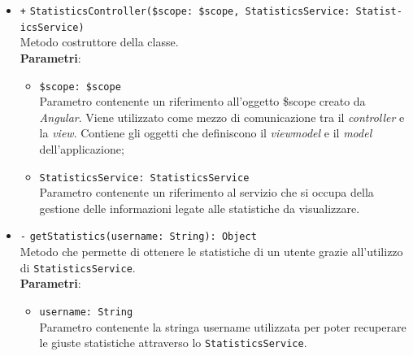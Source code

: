 \begin{itemize}
		\begin{itemize}
		\item \texttt{+} \texttt{StatisticsController(\$scope: \$scope, StatisticsService: Statist-\\icsService)} \\ 
		Metodo costruttore della classe. \\
		\textbf{Parametri}:
		\begin{itemize}
			\item \texttt{\$scope: \$scope} \\
			Parametro contenente un riferimento all'oggetto \$scope creato da \textit{Angular}. Viene utilizzato come mezzo di comunicazione tra il \textit{controller} e la \textit{view}. Contiene gli oggetti che definiscono il \textit{viewmodel} e il \textit{model} dell'applicazione;
			\item \texttt{StatisticsService: StatisticsService} \\
			Parametro contenente un riferimento al servizio che si occupa della gestione delle informazioni legate alle statistiche da visualizzare.
		\end{itemize}
		\item \texttt{-} \texttt{getStatistics(username: String): Object} \\ 
		Metodo che permette di ottenere le statistiche di un utente grazie all'utilizzo di \texttt{StatisticsService}. \\
		\textbf{Parametri}: 
		\begin{itemize}
			\item \texttt{username: String} \\
			Parametro contenente la stringa username utilizzata per poter recuperare le giuste statistiche attraverso lo \texttt{StatisticsService}.
		\end{itemize}
	\end{itemize}
\end{itemize}

